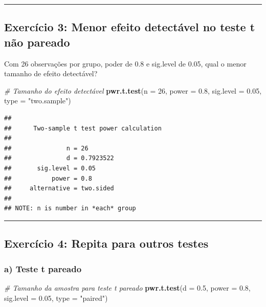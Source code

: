 \documentclass[
]{book}
\newenvironment{Shaded}{\begin{snugshade}}{\end{snugshade}}
\newcommand{\AttributeTok}[1]{\textcolor[rgb]{0.13,0.29,0.53}{#1}}
\newcommand{\CommentTok}[1]{\textcolor[rgb]{0.56,0.35,0.01}{\textit{#1}}}
\newcommand{\DecValTok}[1]{\textcolor[rgb]{0.00,0.00,0.81}{#1}}
\newcommand{\FloatTok}[1]{\textcolor[rgb]{0.00,0.00,0.81}{#1}}
\newcommand{\FunctionTok}[1]{\textcolor[rgb]{0.13,0.29,0.53}{\textbf{#1}}}
\newcommand{\NormalTok}[1]{#1}
\newcommand{\StringTok}[1]{\textcolor[rgb]{0.31,0.60,0.02}{#1}}
\begin{document}
\begin{center}\rule{0.5\linewidth}{0.5pt}\end{center}

\subsection{Exercício 3: Menor efeito detectável no teste t não pareado}\label{exercuxedcio-3-menor-efeito-detectuxe1vel-no-teste-t-nuxe3o-pareado}

Com 26 observações por grupo, poder de 0.8 e sig.level de 0.05, qual o menor tamanho de efeito detectável?

\begin{Shaded}
\begin{Highlighting}[]
\CommentTok{\# Tamanho do efeito detectável}
\FunctionTok{pwr.t.test}\NormalTok{(}\AttributeTok{n =} \DecValTok{26}\NormalTok{, }\AttributeTok{power =} \FloatTok{0.8}\NormalTok{, }\AttributeTok{sig.level =} \FloatTok{0.05}\NormalTok{, }\AttributeTok{type =} \StringTok{"two.sample"}\NormalTok{)}
\end{Highlighting}
\end{Shaded}

\begin{verbatim}
## 
##      Two-sample t test power calculation 
## 
##               n = 26
##               d = 0.7923522
##       sig.level = 0.05
##           power = 0.8
##     alternative = two.sided
## 
## NOTE: n is number in *each* group
\end{verbatim}

\begin{center}\rule{0.5\linewidth}{0.5pt}\end{center}

\subsection{Exercício 4: Repita para outros testes}\label{exercuxedcio-4-repita-para-outros-testes}

\subsubsection{a) Teste t pareado}\label{a-teste-t-pareado}

\begin{Shaded}
\begin{Highlighting}[]
\CommentTok{\# Tamanho da amostra para teste t pareado}
\FunctionTok{pwr.t.test}\NormalTok{(}\AttributeTok{d =} \FloatTok{0.5}\NormalTok{, }\AttributeTok{power =} \FloatTok{0.8}\NormalTok{, }\AttributeTok{sig.level =} \FloatTok{0.05}\NormalTok{, }\AttributeTok{type =} \StringTok{"paired"}\NormalTok{)}
\end{Highlighting}
\end{Shaded}
\end{document}
